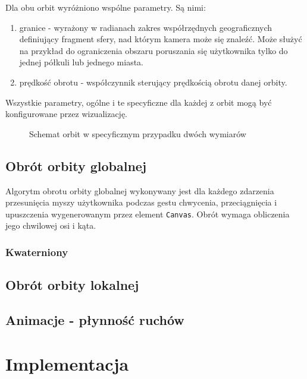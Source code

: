 Dla obu orbit wyróżniono wspólne parametry. Są nimi:
\begin{enumerate}
    \item granice - wyrażony w radianach zakres współrzędnych geograficznych definiujący fragment sfery, nad którym kamera może się znaleźć. Może służyć na przykład do ograniczenia obszaru poruszania się użytkownika tylko do jednej półkuli lub jednego miasta.
    \item prędkość obrotu - współczynnik sterujący prędkością obrotu danej orbity.
\end{enumerate}

Wszystkie parametry, ogólne i te specyficzne dla każdej z orbit mogą być konfigurowane przez wizualizację.

\begin{figure}[]
    \centering
    
    \caption{Schemat orbit w specyficznym przypadku dwóch wymiarów}
    \label{fig:orbits}
\end{figure}



\subsection{Obrót orbity globalnej}

Algorytm obrotu orbity globalnej wykonywany jest dla każdego zdarzenia przesunięcia myszy użytkownika podczas gestu chwycenia, przeciągnięcia i upuszczenia wygenerowanym przez element \texttt{Canvas}. Obrót wymaga obliczenia jego chwilowej osi i kąta.

\subsubsection{Kwaterniony}


\subsection{Obrót orbity lokalnej}

\subsection{Animacje - płynność ruchów}

\section{Implementacja}
